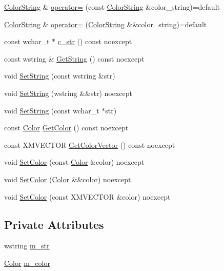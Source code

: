 \begin{DoxyCompactItemize}
\item 
\hyperlink{structmage_1_1_color_string}{Color\+String} \& \hyperlink{structmage_1_1_color_string_a568fed43403422ecafdf92d04e11c4e5}{operator=} (const \hyperlink{structmage_1_1_color_string}{Color\+String} \&color\+\_\+string)=default
\item 
\hyperlink{structmage_1_1_color_string}{Color\+String} \& \hyperlink{structmage_1_1_color_string_a2016416ce91bb7e94a8869201db47ef1}{operator=} (\hyperlink{structmage_1_1_color_string}{Color\+String} \&\&color\+\_\+string)=default
\item 
const wchar\+\_\+t $\ast$ \hyperlink{structmage_1_1_color_string_af2241b81cac59051e9ebf0ddefe719ed}{c\+\_\+str} () const noexcept
\item 
const wstring \& \hyperlink{structmage_1_1_color_string_aee22268a2fe552320299dfa5ac5a93e1}{Get\+String} () const noexcept
\item 
void \hyperlink{structmage_1_1_color_string_aa5ec8bb8e44683ed8a88534f04639930}{Set\+String} (const wstring \&str)
\item 
void \hyperlink{structmage_1_1_color_string_a62a374668fafc55281b97e6374027b25}{Set\+String} (wstring \&\&str) noexcept
\item 
void \hyperlink{structmage_1_1_color_string_a317caadad725b67ede68f1e474e47d3b}{Set\+String} (const wchar\+\_\+t $\ast$str)
\item 
const \hyperlink{structmage_1_1_color}{Color} \hyperlink{structmage_1_1_color_string_afba86162d9c13d76dcdb9cf232e8e89f}{Get\+Color} () const noexcept
\item 
const X\+M\+V\+E\+C\+T\+OR \hyperlink{structmage_1_1_color_string_a9326950147ecdc3c09909518e0dddb76}{Get\+Color\+Vector} () const noexcept
\item 
void \hyperlink{structmage_1_1_color_string_acff8b67574e427674e6abb98da7cca3a}{Set\+Color} (const \hyperlink{structmage_1_1_color}{Color} \&color) noexcept
\item 
void \hyperlink{structmage_1_1_color_string_a45a4a036e48431882c193be5bd718add}{Set\+Color} (\hyperlink{structmage_1_1_color}{Color} \&\&color) noexcept
\item 
void \hyperlink{structmage_1_1_color_string_a298a253ed03e92f4c083b65af9c7dc06}{Set\+Color} (const X\+M\+V\+E\+C\+T\+OR \&color) noexcept
\end{DoxyCompactItemize}
\subsection*{Private Attributes}
\begin{DoxyCompactItemize}
\item 
wstring \hyperlink{structmage_1_1_color_string_a9eb840afa5112cd611f5bb1b21edc045}{m\+\_\+str}
\item 
\hyperlink{structmage_1_1_color}{Color} \hyperlink{structmage_1_1_color_string_a3f351c61281fc49786bc13842527d2a3}{m\+\_\+color}
\end{DoxyCompactItemize}


